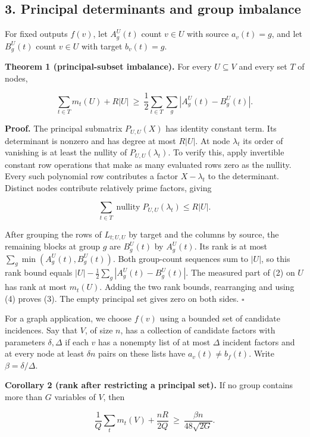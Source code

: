 \documentclass[
  10pt,
]{article}
\begin{document}
\subsection{3. Principal determinants and group
imbalance}\label{principal-determinants-and-group-imbalance}

For fixed outputs \(f(v)\), let \(A_g^U(t)\) count \(v\in U\) with
source \(a_v(t)=g\), and let \(B_g^U(t)\) count \(v\in U\) with target
\(b_v(t)=g\).

\textbf{Theorem 1 (principal-subset imbalance).} For every
\(U\subseteq V\) and every set \(T\) of nodes,

\[
 \sum_{t\in T}m_t(U)+R|U|
 \ \ge\ \frac12\sum_{t\in T}\sum_g|A_g^U(t)-B_g^U(t)|.             \tag{3}
\]

\textbf{Proof.} The principal submatrix \(P_{U,U}(X)\) has identity
constant term. Its determinant is nonzero and has degree at most
\(R|U|\). At node \(\lambda_t\) its order of vanishing is at least the
nullity of \(P_{U,U}(\lambda_t)\). To verify this, apply invertible
constant row operations that make as many evaluated rows zero as the
nullity. Every such polynomial row contributes a factor \(X-\lambda_t\)
to the determinant. Distinct nodes contribute relatively prime factors,
giving

\[
 \sum_{t\in T}\operatorname{nullity}P_{U,U}(\lambda_t)\le R|U|.      \tag{4}
\]

After grouping the rows of \(L_{t;U,U}\) by target and the columns by
source, the remaining blocks at group \(g\) are \(B_g^U(t)\) by
\(A_g^U(t)\). Its rank is at most \(\sum_g\min(A_g^U(t),B_g^U(t))\).
Both group-count sequences sum to \(|U|\), so this rank bound equals
\(|U|-\tfrac12\sum_g|A_g^U(t)-B_g^U(t)|\). The measured part of (2) on
\(U\) has rank at most \(m_t(U)\). Adding the two rank bounds,
rearranging and using (4) proves (3). The empty principal set gives zero
on both sides. \(\square\)

For a graph application, we choose \(f(v)\) using a bounded set of
candidate incidences. Say that \(V\), of size \(n\), has a collection of
candidate factors with parameters \(\delta,\Delta\) if each \(v\) has a
nonempty list of at most \(\Delta\) incident factors and at every node
at least \(\delta n\) pairs on these lists have \(a_v(t)\ne b_f(t)\).
Write \(\beta=\delta/\Delta\).

\textbf{Corollary 2 (rank after restricting a principal set).} If no
group contains more than \(G\) variables of \(V\), then

\[
 \frac1Q\sum_t m_t(V)+\frac{nR}{2Q}
    \ \ge\ \frac{\beta n}{48\sqrt{2G}} .                            \tag{5}
\]
\end{document}
